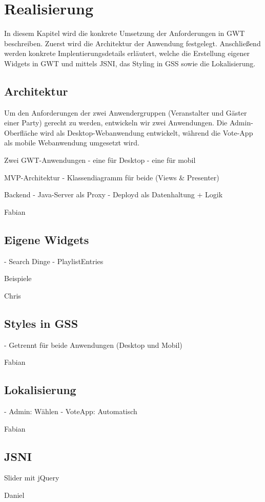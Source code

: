 \section{Realisierung}

In diesem Kapitel wird die konkrete Umsetzung der Anforderungen in GWT beschreiben.
Zuerst wird die Architektur der Anwendung festgelegt. Anschließend werden konkrete
Implentierungsdetails erläutert, welche die Erstellung eigener Widgets in GWT und
mittels JSNI, das Styling in GSS sowie die Lokalisierung.

\subsection{Architektur}

Um den Anforderungen der zwei Anwendergruppen (Veranstalter und Gäster einer Party) gerecht
zu werden, entwickeln wir zwei Anwendungen. Die Admin-Oberfläche wird als Desktop-Webanwendung
entwickelt, während die Vote-App als mobile Webanwendung umgesetzt wird.

Zwei GWT-Anwendungen
- eine für Desktop
- eine für mobil

MVP-Architektur
- Klassendiagramm für beide (Views \& Presenter)

Backend
- Java-Server als Proxy
- Deployd als Datenhaltung + Logik

Fabian

\subsection{Eigene Widgets}
- Search Dinge
- PlaylistEntries

Beispiele

Chris

\subsection{Styles in GSS}
- Getrennt für beide Anwendungen (Desktop und Mobil)

Fabian

\subsection{Lokalisierung}
- Admin: Wählen
- VoteApp: Automatisch

Fabian

\subsection{JSNI}
Slider mit jQuery

Daniel